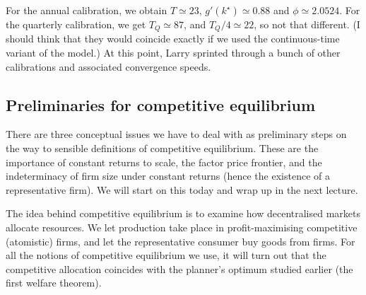 \documentclass[11pt,letterpaper,reqno,oneside]{article}
\begin{document}
For the annual calibration, we obtain $T \simeq 23$, $g'(k^\star) \simeq 0.88$ and $\phi \simeq 2.0524$. For the quarterly calibration, we get $T_Q \simeq 87$, and $T_Q/4 \simeq 22$, so not that different. (I should think that they would coincide exactly if we used the continuous-time variant of the model.) At this point, Larry sprinted through a bunch of other calibrations and associated convergence speeds.



\subsection{Preliminaries for competitive equilibrium}
\label{sec:07Oct2015:preliminaries_competitive_eqm}

There are three conceptual issues we have to deal with as preliminary steps on the way to sensible definitions of competitive equilibrium. These are the importance of constant returns to scale, the factor price frontier, and the indeterminacy of firm size under constant returns (hence the existence of a representative firm). We will start on this today and wrap up in the next lecture.

The idea behind competitive equilibrium is to examine how decentralised markets allocate resources. We let production take place in profit-maximising competitive (atomistic) firms, and let the representative consumer buy goods from firms. For all the notions of competitive equilibrium we use, it will turn out that the competitive allocation coincides with the planner's optimum studied earlier (the first welfare theorem).
\end{document}

